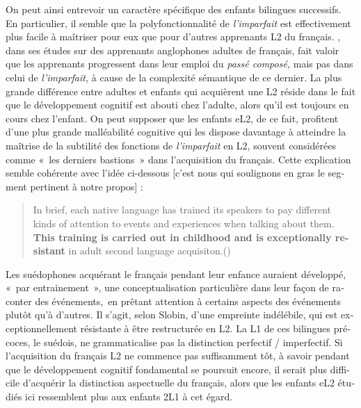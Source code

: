 \documentclass[french, output=paper]{langscibook}
\begin{document}
\begin{otherlanguage}{french}
On peut ainsi entrevoir un caractère spécifique des enfants bilingues successifs. En particulier, il semble que la polyfonctionnalité de \textit{l’imparfait} est effectivement plus facile à maîtriser pour eux que pour d’autres apprenants L2 du français. \citet{Ayoun2004}, dans ses études sur des apprenants anglophones adultes de français, fait valoir que les apprenants progressent dans leur emploi du \textit{passé composé,} mais pas dans celui de \textit{l’imparfait,} à cause de la complexité sémantique de ce dernier. La plus grande différence entre adultes et enfants qui acquièrent une L2 réside dans le fait que le développement cognitif est abouti chez l’adulte, alors qu’il est toujours en cours chez l’enfant. On peut supposer que les enfants eL2, de ce fait, profitent d’une plus grande malléabilité cognitive qui les dispose davantage à atteindre la maîtrise de la subtilité des fonctions de \textit{l’imparfait} en L2, souvent considérées comme «~les derniers bastions~» dans l’acquisition du français. Cette explication semble cohérente avec l'idée ci-dessous [c’est nous qui soulignons en gras le segment pertinent à notre propos] : 


\begin{quote}
In brief, each native language has trained its speakers to pay different kinds of attention to events and experiences when talking about them. \textbf{This training is carried out in childhood and is exceptionally resistant} in adult second language acquisiton.\hbox{}\hfill\hbox{(\citealt[23]{Slobin1996})}
\end{quote}


Les suédophones acquérant le français pendant leur enfance auraient développé, «~par entrainement~», une conceptualisation particulière dans leur façon de raconter des événements,~en prêtant attention à certains aspects des événements plutôt qu’à d’autres. Il s’agit, selon Slobin, d’une empreinte indélébile, qui est exceptionnellement résistante à être restructurée en L2. La L1 de ces bilingues précoces, le suédois, ne grammaticalise pas la distinction perfectif / imperfectif. Si l’acquisition du français L2 ne commence pas suffisamment tôt, à savoir pendant que le développement cognitif fondamental se poursuit encore, il serait plus difficile d’acquérir la distinction aspectuelle du français, alors que les enfants eL2 étudiés ici ressemblent plus aux enfants 2L1 à cet égard.




\end{otherlanguage}
\end{document}
